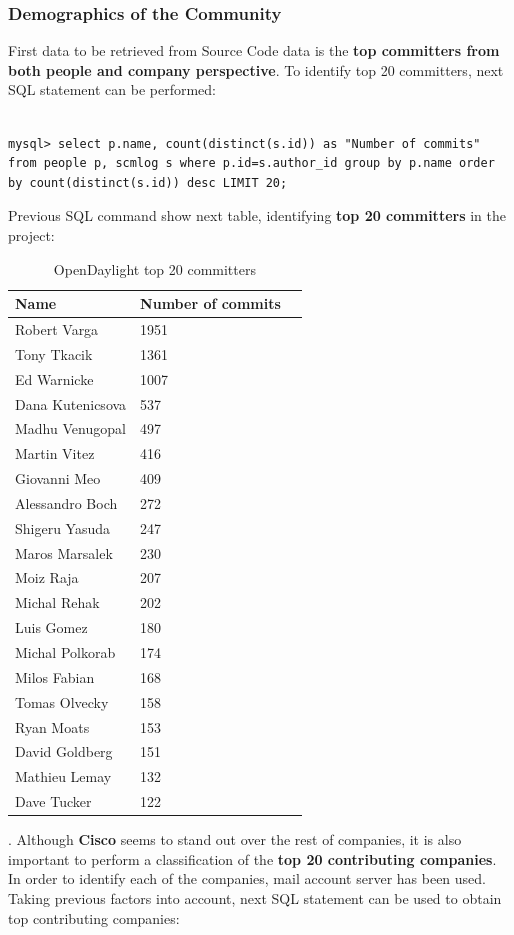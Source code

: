 \documentclass[a4paper, 12pt]{book}
\begin{document}
\subsubsection{Demographics of the Community}
First data to be retrieved from Source Code data is the \textbf{top committers from both people and company perspective}. To identify top 20 committers, next SQL statement can be performed:
\begin{verbatim}

mysql> select p.name, count(distinct(s.id)) as "Number of commits"
from people p, scmlog s where p.id=s.author_id group by p.name order
by count(distinct(s.id)) desc LIMIT 20;

\end{verbatim}
Previous SQL command show next table, identifying \textbf{top 20 committers} in the project:
\begin{table}[H]
\footnotesize
\begin{center}
\begin{tabular}{|l|l|p{3cm}|}
\hline
\textbf{Name}     & \textbf{Number of commits} \\ \hline
 Robert Varga     & 1951 \\ \hline
 Tony Tkacik      & 1361 \\ \hline
 Ed Warnicke      & 1007 \\ \hline
 Dana Kutenicsova &  537 \\ \hline
 Madhu Venugopal  &  497 \\ \hline
 Martin Vitez     &  416 \\ \hline
 Giovanni Meo     &  409 \\ \hline
 Alessandro Boch  &  272 \\ \hline
 Shigeru Yasuda   &  247 \\ \hline
 Maros Marsalek   &  230 \\ \hline
 Moiz Raja        &  207 \\ \hline
 Michal Rehak     &  202 \\ \hline
 Luis Gomez       &  180 \\ \hline
 Michal Polkorab  &  174 \\ \hline
 Milos Fabian     &  168 \\ \hline
 Tomas Olvecky    &  158 \\ \hline
 Ryan Moats       &  153 \\ \hline
 David Goldberg   &  151 \\ \hline
 Mathieu Lemay    &  132 \\ \hline
 Dave Tucker      &  122 \\ \hline
\end{tabular}
\end{center}
\caption{OpenDaylight top 20 committers}
\label{tab:odl_top_committers}
\end{table}
. Although \textbf{Cisco} seems to stand out over the rest of companies, it is also important to perform a classification of the \textbf{top 20 contributing companies}. In order to identify each of the companies, mail account server has been used. Taking previous factors into account, next SQL statement can be used to obtain top contributing companies:
\end{document}
